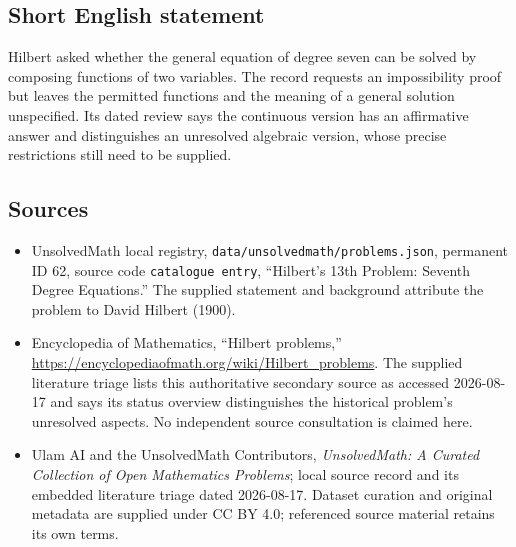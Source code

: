 \documentclass[11pt]{article}
\begin{document}
\subsection{Short English statement}
Hilbert asked whether the general equation of degree seven can be solved by composing functions of two variables. The record requests an impossibility proof but leaves the permitted functions and the meaning of a general solution unspecified. Its dated review says the continuous version has an affirmative answer and distinguishes an unresolved algebraic version, whose precise restrictions still need to be supplied.
\subsection{Sources}
\begin{itemize}
\item UnsolvedMath local registry, \texttt{data/unsolvedmath/problems.json}, permanent ID 62, source code \texttt{catalogue entry}, ``Hilbert's 13th Problem: Seventh Degree Equations.'' The supplied statement and background attribute the problem to David Hilbert (1900).
\item Encyclopedia of Mathematics, ``Hilbert problems,'' \url{https://encyclopediaofmath.org/wiki/Hilbert_problems}. The supplied literature triage lists this authoritative secondary source as accessed 2026-08-17 and says its status overview distinguishes the historical problem's unresolved aspects. No independent source consultation is claimed here.
\item Ulam AI and the UnsolvedMath Contributors, \emph{UnsolvedMath: A Curated Collection of Open Mathematics Problems}; local source record and its embedded literature triage dated 2026-08-17. Dataset curation and original metadata are supplied under CC BY 4.0; referenced source material retains its own terms.
\end{itemize}
\end{document}
